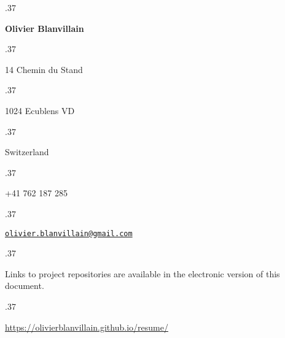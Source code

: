 \documentclass[margin, a4paper]{res}
\let\link\href
\renewcommand{\href}[2]{\link{#1}{\footnotesize\raise-.5pt\hbox{\faExternalLink}}}
\newcommand{\centered}[1]{\moveleft.37\hoffset\centerline{#1}}
\begin{document}
  \centered{\large\textbf{Olivier Blanvillain}}
  \vspace{3pt}
  \centered{14 Chemin du Stand}
  \centered{1024 Ecublens VD}
  \centered{Switzerland}
  \vspace{3pt}
  \centered{+41 762 187 285}
  \centered{\link{mailto:olivier.blanvillain@gmail.com}{\texttt{olivier.blanvillain@gmail.com}}}

  \begin{resume}
    
  \end{resume}

  \vspace{25pt}

  \centered{\footnotesize Links to project repositories are available in the electronic version of this document.}
  \centered{\footnotesize \url{https://olivierblanvillain.github.io/resume/}}
\end{document}
